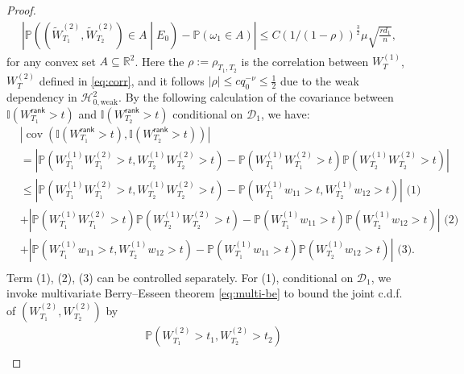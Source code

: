 \documentclass[12pt]{article}
\newcommand{\abs}[1]{\left\lvert#1\right\rvert}
\newcommand{\PP}{\mathbb{P}}
\newcommand{\R}{\mathbb{R}}
\newcommand{\cH}{\mathcal{H}}
\newcommand{\cD}{\mathcal{D}}
\newcommand{\bbI}{\mathbb{I}}
\def\PP{{\mathbb P}}
\theoremstyle{plain}
\begin{document}
\begin{proof}
\begin{equation}\label{eq:multi-be}
    \begin{aligned}
    \abs{\PP\left((\widetilde{W}^{(2)}_{T_1},\widetilde{W}^{(2)}_{T_2})\in {A} \middle| E_0 \right)-\PP(\omega_1\in{A})}\le C(1/(1-\rho))^{\frac{3}{2}} \mu \sqrt{\frac{r d_1}{n}},
    \end{aligned}
\end{equation}
for any convex set ${A} \subseteq \R^2$. Here the $\rho:=\rho_{T_1,T_2}$ is the correlation between $W^{(1)}_T$, $W^{(2)}_T$ defined in \eqref{eq:corr}, and it follows $\abs{\rho}\le c q_0^{-\nu}\le \frac{1}{2}$  due to the weak dependency in $\cH_{0,\text{weak} }^2$. By the following calculation of the covariance between $\bbI(W_{T_1}^{\mathsf{rank} }>t)$ and $\bbI(W_{T_2}^{\mathsf{rank} }>t)$ conditional on  $\cD_1$, we have:
\begin{equation*}
\begin{aligned}
     &\abs{\operatorname{cov}(\bbI(W_{T_1}^{\mathsf{rank} }>t),\bbI(W_{T_2}^{\mathsf{rank} }>t)) } \\
     & = \abs{\PP(W^{(1)}_{T_1}W^{(2)}_{T_1} >t, W^{(1)}_{T_2}W^{(2)}_{T_2}>t )- \PP(W^{(1)}_{T_1}W^{(2)}_{T_1} >t )\PP(W^{(1)}_{T_2}W^{(2)}_{T_2} >t ) } \\
     & \le \abs{\PP(W^{(1)}_{T_1}W^{(2)}_{T_1} >t, W^{(1)}_{T_2}W^{(2)}_{T_2}>t )- \PP( {W}^{(1)}_{T_1} w_{11} > t, {W}^{(1)}_{T_2}w_{12} > t  )} \text{ (1)}\\ &+\abs{\PP(W^{(1)}_{T_1}W^{(2)}_{T_1} >t )\PP(W^{(1)}_{T_2}W^{(2)}_{T_2} >t )- \PP( {W}^{(1)}_{T_1} w_{11} > t  )\PP( {W}^{(1)}_{T_2} w_{12} > t  ) } \text{ (2)}\\
     &+\abs{\PP( {W}^{(1)}_{T_1} w_{11} > t, {W}^{(1)}_{T_2}w_{12} > t  )- \PP( {W}^{(1)}_{T_1} w_{11} > t  )\PP( {W}^{(1)}_{T_2} w_{12} > t  ) } \text{ (3)}.\\
\end{aligned}
\end{equation*}
Term (1), (2), (3) can be controlled separately. For (1), conditional on  $\cD_1$, we invoke multivariate Berry--Esseen theorem \eqref{eq:multi-be} to bound the joint c.d.f. of $(W^{(2)}_{T_1}, W^{(2)}_{T_2})$ by  
\begin{equation*}
    \begin{aligned}
    &\PP(W^{(2)}_{T_1} >t_1, W^{(2)}_{T_2}>t_2 ) \\

\end{aligned}
\end{equation*}
\end{proof}
\end{document}
